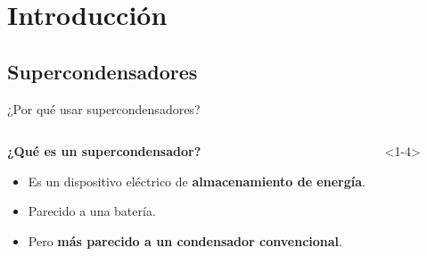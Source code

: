 \documentclass[aspectratio=169]{beamer}
\begin{document}
	\section{Introducción}
	\subsection{Supercondensadores}
	\begin{frame}{¿Por qué usar supercondensadores?}
		\begin{columns}
			\begin{column}{0.5\textwidth}
				\only<1->\textbf{¿Qué es un supercondensador?}
				\begin{itemize}[<+(1)->]
					\item Es un dispositivo eléctrico de \textbf{almacenamiento de energía}.
					\item Parecido a una batería.
					\item Pero \textbf{más parecido a un condensador convencional}.
				\end{itemize}
			\end{column}
			\begin{column}{0.5\textwidth}
				\begin{onlyenv}<1-4>
					\begin{figure}[b]
\end{figure}
\end{onlyenv}
\end{column}
\end{columns}
\end{frame}
\end{document}
